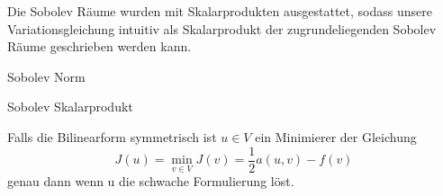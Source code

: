 Die Sobolev Räume wurden mit Skalarprodukten ausgestattet, sodass unsere Variationsgleichung intuitiv als Skalarprodukt der zugrundeliegenden Sobolev Räume geschrieben werden kann.

\begin{Lemma} Sobolev Norm
\end{Lemma}

\begin{Lemma} Sobolev Skalarprodukt
\end{Lemma}

\begin{Lemma}
Falls die Bilinearform symmetrisch ist $u \in V$ ein Minimierer der Gleichung
\begin{equation} \label{eq:mini}
J(u) = \min_{v \in V} J(v) = \dfrac{1}{2} a(u,v) - f(v)
\end{equation}
genau dann wenn u die schwache Formulierung löst.
\end{Lemma}


